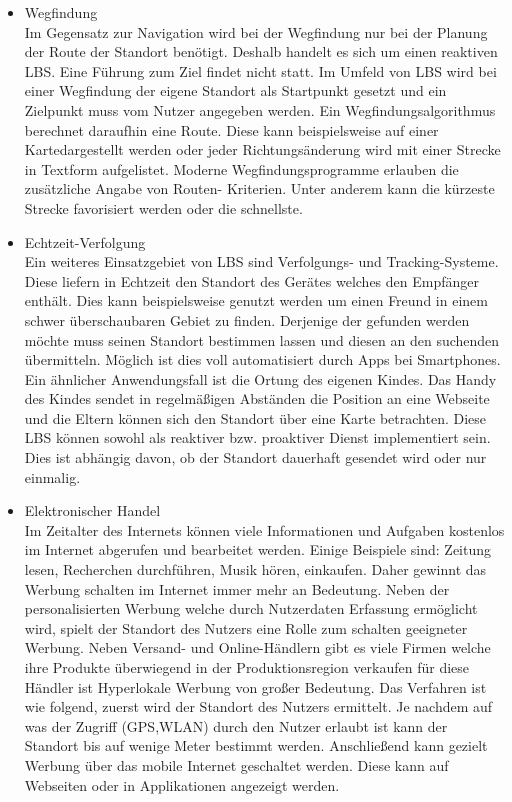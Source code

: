 \begin{itemize}
	\item Wegfindung\\
Im Gegensatz zur Navigation wird bei der Wegfindung nur bei der Planung der Route der Standort benötigt. Deshalb handelt es sich um einen reaktiven LBS. Eine Führung zum Ziel findet nicht statt. Im Umfeld von LBS wird bei einer Wegfindung der eigene Standort als Startpunkt gesetzt und ein Zielpunkt muss vom Nutzer angegeben werden. Ein Wegfindungsalgorithmus berechnet daraufhin eine Route. Diese kann beispielsweise auf einer Kartedargestellt werden oder jeder Richtungsänderung wird mit einer Strecke in Textform aufgelistet. Moderne Wegfindungsprogramme erlauben die zusätzliche Angabe von Routen- Kriterien. Unter anderem kann die kürzeste Strecke favorisiert werden oder die schnellste.   
	\item Echtzeit-Verfolgung\\
Ein weiteres Einsatzgebiet von LBS sind Verfolgungs- und Tracking-Systeme. Diese liefern in Echtzeit den Standort des Gerätes welches den Empfänger enthält. Dies kann beispielsweise genutzt werden um einen Freund in einem schwer überschaubaren Gebiet zu finden. Derjenige der gefunden werden möchte muss seinen Standort bestimmen lassen und diesen an den suchenden übermitteln. Möglich ist dies voll automatisiert durch Apps bei Smartphones. Ein ähnlicher Anwendungsfall ist die Ortung des eigenen Kindes. Das Handy des Kindes sendet in regelmäßigen Abständen die Position an eine Webseite und die Eltern können sich den Standort über eine Karte betrachten. Diese LBS können sowohl als reaktiver bzw. proaktiver Dienst implementiert sein. Dies ist abhängig davon, ob der Standort dauerhaft gesendet wird oder nur einmalig.\cite{FreundeFinden} \cite{KiFinden} 
	\item Elektronischer Handel\\
Im Zeitalter des Internets können viele Informationen und Aufgaben kostenlos im Internet abgerufen und bearbeitet werden. Einige Beispiele sind: Zeitung lesen, Recherchen durchführen, Musik hören, einkaufen. Daher gewinnt das Werbung schalten im Internet immer mehr an Bedeutung. Neben der personalisierten Werbung welche durch Nutzerdaten Erfassung ermöglicht wird, spielt der Standort des Nutzers eine Rolle zum schalten geeigneter Werbung. Neben Versand- und Online-Händlern gibt es viele Firmen welche ihre Produkte überwiegend in der Produktionsregion verkaufen für diese Händler ist Hyperlokale Werbung von großer Bedeutung. Das Verfahren ist wie folgend, zuerst wird der Standort des Nutzers ermittelt. Je nachdem auf was der Zugriff (GPS,WLAN) durch den Nutzer erlaubt ist kann der Standort bis auf wenige Meter bestimmt werden. Anschließend kann gezielt Werbung über das mobile Internet geschaltet werden. Diese kann auf Webseiten oder in Applikationen angezeigt werden. \cite{HyperWerbung} \cite{Adwords}

\end{itemize}
